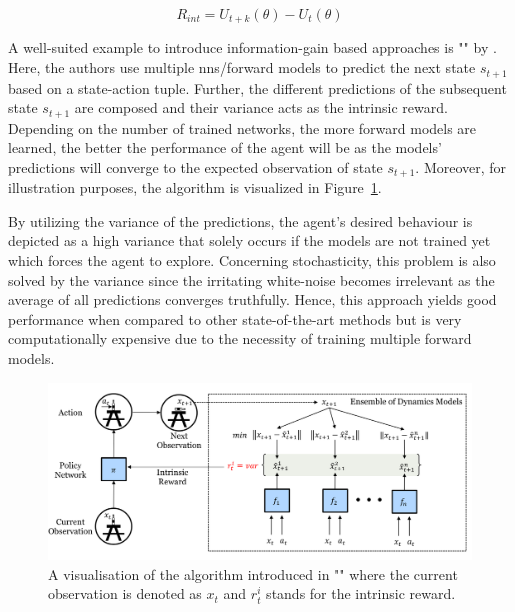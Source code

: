 \documentclass[draft,final]{vutinfth} %
\begin{document}
    \begin{equation}
        R_{int}=U_{t+k}(\theta) - U_t(\theta)
    \end{equation}

    A well-suited example to introduce information-gain based approaches is "" by \citet{pathak_self-supervised_2019}.
    Here, the authors use multiple \glspl{nn}/forward models to predict the next state $s_{t+1}$ based on a state-action tuple.
    Further, the different predictions of the subsequent state $s_{t+1}$ are composed and their variance acts as the intrinsic reward.
    Depending on the number of trained networks, the more forward models are learned, the better the performance of the agent will be as the models' predictions will converge to the expected observation of state $s_{t+1}$.
    Moreover, for illustration purposes, the algorithm is visualized in Figure~\ref{fig:ensemble_dissagreement}.

    By utilizing the variance of the predictions, the agent's desired behaviour is depicted as a high variance that solely occurs if the models are not trained yet which forces the agent to explore.
    Concerning stochasticity, this problem is also solved by the variance since the irritating white-noise becomes irrelevant as the average of all predictions converges truthfully.
    Hence, this approach yields good performance when compared to other state-of-the-art methods but is very computationally expensive due to the necessity of training multiple forward models.

    \begin{figure}[h]
        \centering
        \includegraphics[width=\textwidth]{figures/ensemble_dissagreement.png}
        \caption[A visualisation of the algorithm introduced in ""]{A visualisation of the algorithm introduced in "" where the current observation is denoted as $x_t$ and $r_t^i$ stands for the intrinsic reward.\protect\footnotemark}
        \label{fig:ensemble_dissagreement}
    \end{figure}
\end{document}
